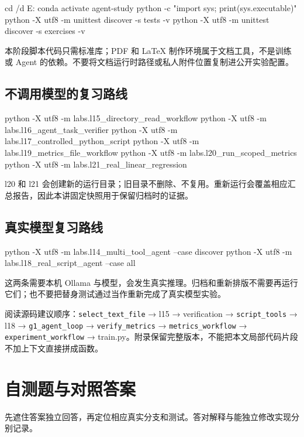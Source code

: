 \begin{Code}
cd /d E:\study\agent
conda activate agent-study
python -c "import sys; print(sys.executable)"
python -X utf8 -m unittest discover -s tests -v
python -X utf8 -m unittest discover -s exercises -v
\end{Code}

本阶段脚本代码只需标准库；PDF 和 LaTeX 制作环境属于文档工具，不是训练或 Agent 的依赖。不要将文档运行时路径或私人附件位置复制进公开实验配置。

\subsection{不调用模型的复习路线}

\begin{Code}
python -X utf8 -m labs.l15_directory_read_workflow
python -X utf8 -m labs.l16_agent_task_verifier
python -X utf8 -m labs.l17_controlled_python_script
python -X utf8 -m labs.l19_metrics_file_workflow
python -X utf8 -m labs.l20_run_scoped_metrics
python -X utf8 -m labs.l21_real_linear_regression
\end{Code}

l20 和 l21 会创建新的运行目录；旧目录不删除、不复用。重新运行会覆盖相应汇总报告，因此本讲固定快照用于保留归档时的证据。

\subsection{真实模型复习路线}

\begin{Code}
python -X utf8 -m labs.l14_multi_tool_agent --case discover
python -X utf8 -m labs.l18_real_script_agent --case all
\end{Code}

这两条需要本机 Ollama 与模型，会发生真实推理。归档和重新排版不需要再运行它们；也不要把替身测试通过当作重新完成了真实模型实验。

阅读源码建议顺序：\nolinkurl{select_text_file} → l15 → verification → \nolinkurl{script_tools} → l18 → \nolinkurl{g1_agent_loop} → \nolinkurl{verify_metrics} → \nolinkurl{metrics_workflow} → \nolinkurl{experiment_workflow} → train.py。附录保留完整版本，不能把本文局部代码片段不加上下文直接拼成函数。

\section{自测题与对照答案}

先遮住答案独立回答，再定位相应真实分支和测试。答对解释与能独立修改实现分别记录。


